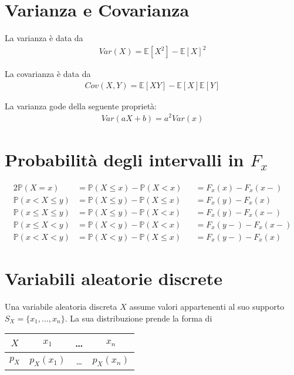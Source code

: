 \documentclass{article}
\begin{document}
\section{Varianza e Covarianza}

La varianza \`e data da
\begin{align*}
Var(X) = \mathbb{E}[X^2] - \mathbb{E}[X]^2
\end{align*}

La covarianza \`e data da
\begin{align*}
Cov(X, Y) = \mathbb{E}[XY] - \mathbb{E}[X]\mathbb{E}[Y]
\end{align*}

La varianza gode della seguente propriet\`a:
\begin{align*}
Var(aX+b) = a^2 Var(x)
\end{align*}

\section{Probabilit\`a degli intervalli in $F_x$}

\begin{alignat*}{2}
\mathbb{P}(X = x) &= \mathbb{P}(X \leq x) - \mathbb{P}(X < x) &&= F_x(x) - F_x(x-) \\
\mathbb{P}(x < X \leq y) &= \mathbb{P}(X \leq y) - \mathbb{P}(X \leq x) &&= F_x(y) - F_x(x) \\
\mathbb{P}(x \leq X \leq y) &= \mathbb{P}(X \leq y) - \mathbb{P}(X < x) &&= F_x(y) - F_x(x-) \\
\mathbb{P}(x \leq X < y) &= \mathbb{P}(X < y) - \mathbb{P}(X < x) &&= F_x(y-) - F_x(x-) \\
\mathbb{P}(x < X < y) &= \mathbb{P}(X < y) - \mathbb{P}(X \leq x) &&= F_x(y-) - F_x(x)
\end{alignat*}

\section{Variabili aleatorie discrete}

Una variabile aleatoria discreta $X$ assume valori appartenenti al suo supporto $S_X = \{x_1, \ldots, x_n\}$.
La sua distribuzione prende la forma di
\begin{center}
\begin{tabular}{ c|c|c|c } 
 $X$ & $x_1$ & \ldots & $x_n$ \\ 
 \hline
 $p_X$ & $p_X(x_1)$ & \ldots & $p_X(x_n)$
\end{tabular}
\end{center}
\end{document}
